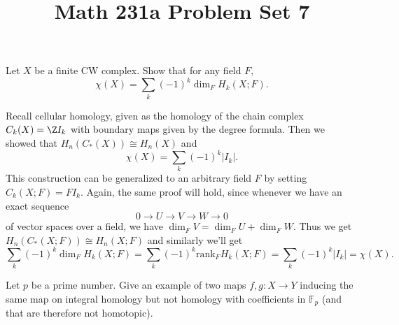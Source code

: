 \documentclass[11pt,letterpaper]{article}
\title{\textbf{Math 231a Problem Set 7}}
\begin{document}
\maketitle

\begin{problem}
    Let $X$ be a finite CW complex. Show that for any field $F$,
    \[
        \chi(X) = \sum_k (-1)^k \dim_F H_k(X; F)
    .\] 
\end{problem}
\begin{solution}
    \quad Recall cellular homology, given as the homology of the chain complex $C_k(X) = \Z I_k$ with boundary maps given by the degree formula. Then we showed that $H_n(C_*(X))\cong H_n(X)$ and
    \[
        \chi(X) = \sum_k (-1)^k |I_k|
    .\]
    \quad This construction can be generalized to an arbitrary field $F$ by setting $C_k(X; F) = F I_k$. Again, the same proof will hold, since whenever we have an exact sequence \[0 \to U \to V \to W \to 0\] of vector spaces over a field, we have $\dim_F V = \dim_F U + \dim_F W$. Thus we get $H_n(C_*(X; F)) \cong H_n(X; F)$ and similarly we'll get
    \[
        \sum_k (-1)^k \dim_F H_k(X; F) = \sum_k (-1)^k \text{rank}_F H_k(X; F) = \sum_k (-1)^k |I_k| = \chi(X)
    .\] 
\end{solution}

\begin{problem}
    Let $p$ be a prime number. Give an example of two maps $f, g : X \to Y$ inducing the same map on integral homology but not homology with coefficients in $\mathbb{F}_p$ (and that are therefore not homotopic).
\end{problem}
\end{document}
